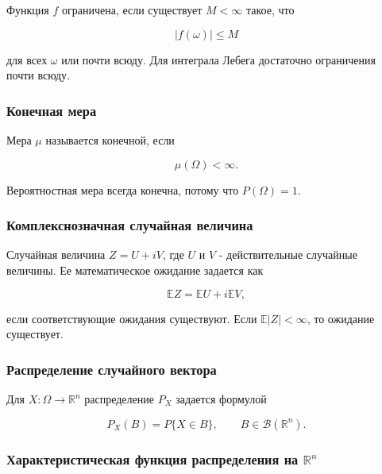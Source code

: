 \documentclass[
  11pt,
  a4paper,
]{article}
\begin{document}
Функция \(f\) ограничена, если существует \(M<\infty\) такое, что

\[
|f(\omega)|\le M
\]

для всех \(\omega\) или почти всюду. Для интеграла Лебега достаточно
ограничения почти всюду.

\subsubsection{Конечная
мера}\label{ux43aux43eux43dux435ux447ux43dux430ux44f-ux43cux435ux440ux430}

Мера \(\mu\) называется конечной, если

\[
\mu(\Omega)<\infty.
\]

Вероятностная мера всегда конечна, потому что \(P(\Omega)=1\).

\subsubsection{Комплекснозначная случайная
величина}\label{ux43aux43eux43cux43fux43bux435ux43aux441ux43dux43eux437ux43dux430ux447ux43dux430ux44f-ux441ux43bux443ux447ux430ux439ux43dux430ux44f-ux432ux435ux43bux438ux447ux438ux43dux430}

Случайная величина \(Z=U+iV\), где \(U\) и \(V\) - действительные
случайные величины. Ее математическое ожидание задается как

\[
\mathbb EZ=\mathbb EU+i\mathbb EV,
\]

если соответствующие ожидания существуют. Если \(\mathbb E|Z|<\infty\),
то ожидание существует.

\subsubsection{Распределение случайного
вектора}\label{ux440ux430ux441ux43fux440ux435ux434ux435ux43bux435ux43dux438ux435-ux441ux43bux443ux447ux430ux439ux43dux43eux433ux43e-ux432ux435ux43aux442ux43eux440ux430}

Для \(X:\Omega\to\mathbb R^n\) распределение \(P_X\) задается формулой

\[
P_X(B)=P\{X\in B\},
\qquad B\in\mathcal B(\mathbb R^n).
\]

\subsubsection{\texorpdfstring{Характеристическая функция распределения
на
\(\mathbb R^n\)}{Характеристическая функция распределения на \textbackslash mathbb R\^{}n}}\label{ux445ux430ux440ux430ux43aux442ux435ux440ux438ux441ux442ux438ux447ux435ux441ux43aux430ux44f-ux444ux443ux43dux43aux446ux438ux44f-ux440ux430ux441ux43fux440ux435ux434ux435ux43bux435ux43dux438ux44f-ux43dux430-mathbb-rn}
\end{document}
